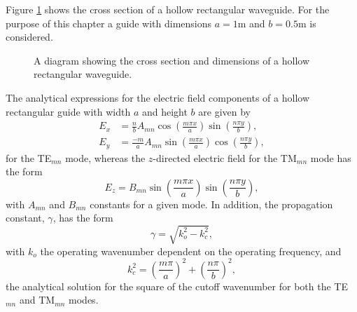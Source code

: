 Figure \ref{lezar:fig:hollow_rectangular_guide} shows the cross section of a
hollow rectangular waveguide. For the purpose of this chapter a guide
with dimensions $a = 1\text{m}$ and $b = 0.5\text{m}$ is considered.
\begin{figure}[ht]
    \centering
    \caption{A diagram showing the cross section and dimensions of a hollow rectangular waveguide.}
    \label{lezar:fig:hollow_rectangular_guide}
\end{figure}
The analytical expressions for the electric field components of a
hollow rectangular guide with width $a$ and height $b$ are given
by~\cite{Poz2005}
\begin{align}
    \label{lezar:eqn:rect:E_x analytical}
    E_x &= \frac{n}{b}A_{mn}\cos\left(\frac{m\pi
    x}{a}\right)\sin\left(\frac{n\pi y}{b}\right),\\
    \label{lezar:eqn:rect:E_y analytical}
    E_y &= \frac{-m}{a}A_{mn}\sin\left(\frac{m\pi x}{a}\right)\cos\left(\frac{n\pi y}{b}\right),
\end{align}
for the TE$_{mn}$ mode, whereas the $z$-directed electric field for the TM$_{mn}$ mode has the form~\cite{Poz2005}
\begin{equation}
 \label{lezar:eqn:rect_E_z_analytical}
 E_z = B_{mn}\sin\left(\frac{m\pi x}{a}\right)\sin\left(\frac{n\pi y}{b}\right),
\end{equation}
with $A_{mn}$ and $B_{mn}$ constants for a given mode.
In addition, the propagation constant, $\gamma$, has the form
\begin{equation}
 \label{lezar:eqn:rectangular_propagation}
 \gamma = \sqrt{k_o^2 - k_c^2},
\end{equation}
with $k_o$ the operating wavenumber dependent on the operating frequency, and
\begin{equation}
 \label{lezar:eqn:rectangular_cutoff}
 k_c^2 = \left(\frac{m\pi}{a}\right)^2 + \left(\frac{n\pi}{b}\right)^2,
\end{equation}
the analytical solution for the square of the cutoff wavenumber for both the TE$_{mn}$ and TM$_{mn}$ modes.

